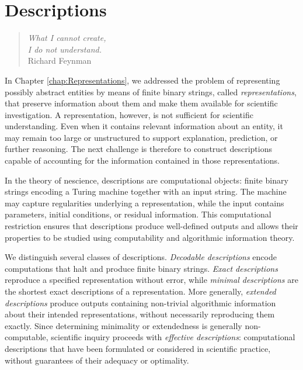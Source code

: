 %
%


\chapter{Descriptions}
\label{chap:Descriptions}

\begin{quote}
\begin{flushright}
\emph{What I cannot create, \\
I do not understand.} \\
Richard Feynman
\end{flushright}
\end{quote}
\bigskip

%
%

In Chapter \ref{chap:Representations}, we addressed the problem of representing possibly abstract entities by means of finite binary strings, called \emph{representations}, that preserve information about them and make them available for scientific investigation. A representation, however, is not sufficient for scientific understanding. Even when it contains relevant information about an entity, it may remain too large or unstructured to support explanation, prediction, or further reasoning. The next challenge is therefore to construct descriptions capable of accounting for the information contained in those representations.

In the theory of nescience, descriptions are computational objects: finite binary strings encoding a Turing machine together with an input string. The machine may capture regularities underlying a representation, while the input contains parameters, initial conditions, or residual information. This computational restriction ensures that descriptions produce well-defined outputs and allows their properties to be studied using computability and algorithmic information theory.

We distinguish several classes of descriptions. \emph{Decodable descriptions} encode computations that halt and produce finite binary strings. \emph{Exact descriptions} reproduce a specified representation without error, while \emph{minimal descriptions} are the shortest exact descriptions of a representation. More generally, \emph{extended descriptions} produce outputs containing non-trivial algorithmic information about their intended representations, without necessarily reproducing them exactly. Since determining minimality or extendedness is generally non-computable, scientific inquiry proceeds with \emph{effective descriptions}: computational descriptions that have been formulated or considered in scientific practice, without guarantees of their adequacy or optimality.

